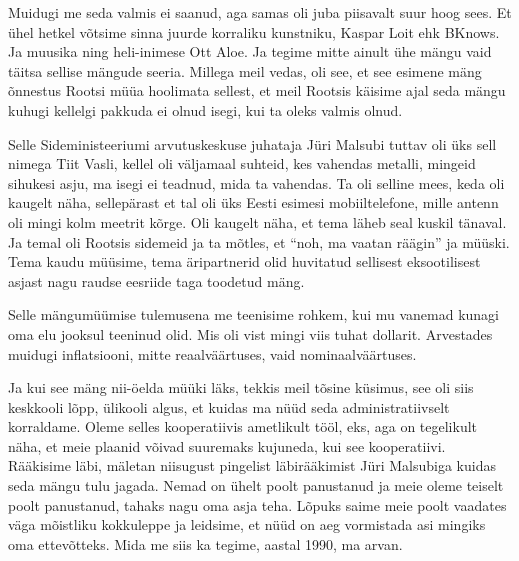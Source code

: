 Muidugi me seda valmis ei saanud, aga samas oli juba piisavalt suur hoog sees. Et ühel hetkel võtsime sinna juurde korraliku kunstniku, Kaspar Loit ehk BKnows. Ja muusika ning heli-inimese Ott Aloe. Ja tegime mitte ainult ühe mängu vaid täitsa sellise mängude seeria. Millega meil vedas, oli see, et see esimene mäng õnnestus Rootsi müüa hoolimata sellest, et meil Rootsis käisime ajal seda mängu kuhugi kellelgi pakkuda ei olnud isegi, kui ta oleks valmis olnud.


Selle Sideministeeriumi arvutuskeskuse juhataja Jüri Malsubi  tuttav oli üks sell nimega Tiit Vasli, kellel oli väljamaal suhteid, kes vahendas metalli, mingeid sihukesi asju, ma isegi ei teadnud, mida ta vahendas. Ta oli selline mees, keda oli kaugelt näha, sellepärast et tal oli üks Eesti esimesi mobiiltelefone, mille antenn oli mingi kolm meetrit kõrge. Oli kaugelt näha, et tema läheb seal kuskil tänaval. Ja temal oli Rootsis sidemeid ja ta mõtles, et \enquote{noh, ma vaatan räägin} ja müüski. Tema kaudu müüsime, tema äripartnerid olid huvitatud sellisest eksootilisest asjast nagu raudse eesriide taga toodetud mäng. 

Selle mängumüümise tulemusena me teenisime rohkem, kui mu vanemad kunagi oma elu jooksul teeninud olid. Mis oli vist mingi viis tuhat dollarit. Arvestades muidugi inflatsiooni, mitte reaalväärtuses, vaid nominaalväärtuses. 

Ja kui see mäng nii-öelda müüki läks, tekkis meil tõsine küsimus, see oli siis keskkooli lõpp, ülikooli algus, et kuidas ma nüüd seda administratiivselt korraldame. Oleme selles kooperatiivis  ametlikult tööl, eks, aga on tegelikult näha, et meie plaanid võivad suuremaks kujuneda, kui see kooperatiivi. Rääkisime läbi, mäletan niisugust pingelist läbirääkimist Jüri Malsubiga kuidas seda mängu tulu jagada. Nemad on ühelt poolt panustanud ja meie oleme teiselt poolt panustanud, tahaks nagu oma asja teha. Lõpuks saime meie poolt vaadates väga mõistliku kokkuleppe ja leidsime, et nüüd on aeg vormistada asi mingiks oma ettevõtteks. Mida me siis ka tegime, aastal 1990, ma arvan. 


